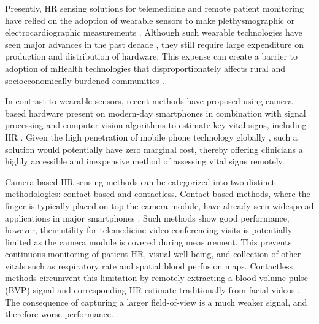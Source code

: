 Presently, HR sensing solutions for telemedicine and remote patient monitoring have relied on the adoption of wearable sensors to make plethysmographic or electrocardiographic measurements \cite{dinh-le_wearable_2019,lukas_emerging_2020}. Although such wearable technologies have seen major advances in the past decade \cite{kumar_mobile_2013, steinhubl_emerging_2015}, they still require large expenditure on production and distribution of hardware. This expense can create a barrier to adoption of mHealth technologies that disproportionately affects rural and socioeconomically burdened communities \cite{sawyer_wearable_2020}. 

In contrast to wearable sensors, recent methods have proposed using camera-based hardware present on modern-day smartphones in combination with signal processing and computer vision algorithms to estimate key vital signs, including HR \cite{li_current_2019}. Given the high penetration of mobile phone technology globally \cite{pew_demographics_2019}, such a solution would potentially have zero marginal cost, thereby offering clinicians a highly accessible and inexpensive method of assessing vital signs remotely. 

Camera-based HR sensing methods can be categorized into two distinct methodologies: contact-based and contactless. Contact-based methods, where the finger is typically placed on top the camera module, have already seen widespread applications in major smartphones \cite{proesmans_mobile_2019,li_current_2019}. Such methods show good performance, however, their utility for telemedicine video-conferencing visits is potentially limited as the camera module is covered during measurement. This prevents continuous monitoring of patient HR, visual well-being, and collection of other vitals such as respiratory rate and spatial blood perfusion maps. Contactless methods circumvent this limitation by remotely extracting a blood volume pulse (BVP) signal and corresponding HR estimate traditionally from facial videos \cite{rouast_remote_2018}. The consequence of capturing a larger field-of-view is a much weaker signal, and therefore worse performance. 

